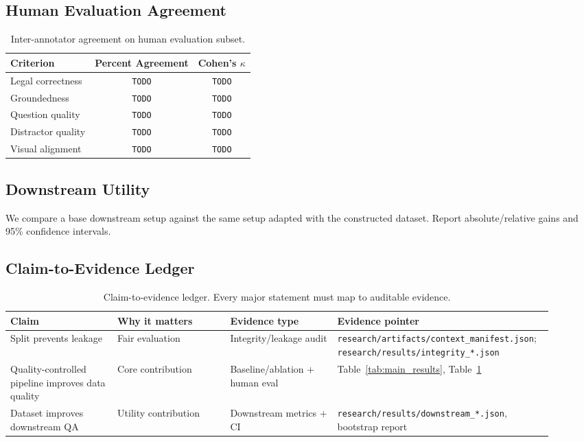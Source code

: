 \subsection{Human Evaluation Agreement}
\begin{table}[t]
\centering
\small
\begin{tabular}{lcc}
\hline
Criterion & Percent Agreement & Cohen's $\kappa$ \\
\hline
Legal correctness & \texttt{TODO} & \texttt{TODO} \\
Groundedness & \texttt{TODO} & \texttt{TODO} \\
Question quality & \texttt{TODO} & \texttt{TODO} \\
Distractor quality & \texttt{TODO} & \texttt{TODO} \\
Visual alignment & \texttt{TODO} & \texttt{TODO} \\
\hline
\end{tabular}
\caption{Inter-annotator agreement on human evaluation subset.}
\label{tab:agreement}
\end{table}

\subsection{Downstream Utility}
We compare a base downstream setup against the same setup adapted with the constructed dataset. Report absolute/relative gains and 95\% confidence intervals.

\subsection{Claim-to-Evidence Ledger}
\label{sec:claim_evidence}
\begin{table}[t]
\centering
\small
\begin{tabular}{p{0.19\linewidth}p{0.20\linewidth}p{0.19\linewidth}p{0.34\linewidth}}
\hline
Claim & Why it matters & Evidence type & Evidence pointer \\
\hline
Split prevents leakage & Fair evaluation & Integrity/leakage audit & \texttt{research/artifacts/context\_manifest.json}; \texttt{research/results/integrity\_*.json} \\
Quality-controlled pipeline improves data quality & Core contribution & Baseline/ablation + human eval & Table~\ref{tab:main_results}, Table~\ref{tab:agreement} \\
Dataset improves downstream QA & Utility contribution & Downstream metrics + CI & \texttt{research/results/downstream\_*.json}, bootstrap report \\
\hline
\end{tabular}
\caption{Claim-to-evidence ledger. Every major statement must map to auditable evidence.}
\label{tab:claim_evidence}
\end{table}

